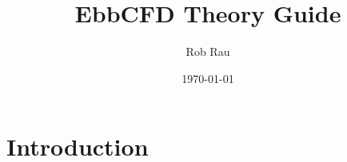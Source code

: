 \documentclass[12pt,parskip=full]{article}
\numberwithin{subsection}{section}
\begin{document}
	\vspace{-4ex}
	\title{EbbCFD Theory Guide\vspace{-3.5ex}}
	\author{Rob Rau\vspace{-4ex}}
	\date{\today\vspace{-4ex}}
	\maketitle

	\section{Introduction}
		
	
\end{document}
